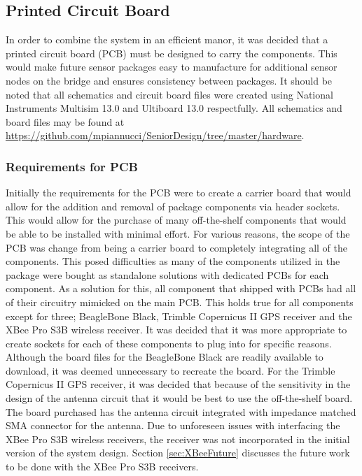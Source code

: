 \subsection{Printed Circuit Board}
\label{sec:PCB}
In order to combine the system in an efficient manor, it was decided that a printed circuit board (PCB) must be designed to carry the components.
This would make future sensor packages easy to manufacture for additional sensor nodes on the bridge and ensures consistency between packages.
It should be noted that all schematics and circuit board files were created using National Instruments Multisim 13.0 and Ultiboard 13.0 respectfully.
All schematics and board files may be found at \url{https://github.com/mpiannucci/SeniorDesign/tree/master/hardware}.
 
\subsubsection{Requirements for PCB}
Initially the requirements for the PCB were to create a carrier board that would allow for the addition and removal of package components via header sockets.
This would allow for the purchase of many off-the-shelf components that would be able to be installed with minimal effort.
For various reasons, the scope of the PCB was change from being a carrier board to completely integrating all of the components.
This posed difficulties as many of the components utilized in the package were bought as standalone solutions with dedicated PCBs for each component.
As a solution for this, all component that shipped with PCBs had all of their circuitry mimicked on the main PCB.
This holds true for all components except for three; BeagleBone Black, Trimble Copernicus II GPS receiver and the XBee Pro S3B wireless receiver.
It was decided that it was more appropriate to create sockets for each of these components to plug into for specific reasons.
Although the board files for the BeagleBone Black are readily available to download, it was deemed unnecessary to recreate the board.
For the Trimble Copernicus II GPS receiver, it was decided that because of the sensitivity in the design of the antenna circuit that it would be best to use the off-the-shelf board.
The board purchased has the antenna circuit integrated with impedance matched SMA connector for the antenna.
Due to unforeseen issues with interfacing the XBee Pro S3B wireless receivers, the receiver was not incorporated in the initial version of the system design.
Section \ref{sec:XBeeFuture} discusses the future work to be done with the XBee Pro S3B receivers.